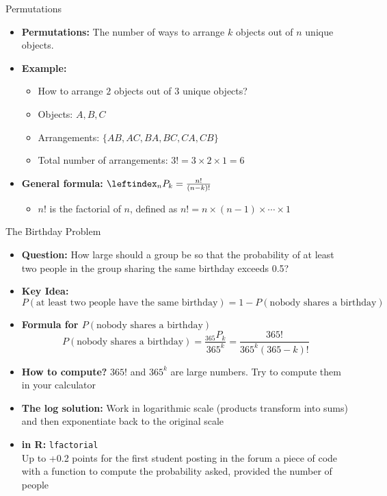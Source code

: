 \documentclass[aspectratio=169]{beamer}
\begin{document}
\begin{frame}{Permutations}
    \begin{itemize}
        \item \textbf{Permutations:} The number of ways to arrange \(k\) objects out of \(n\) unique objects.
        \item \textbf{Example:}
        \begin{itemize}
            \item[$\bullet$] How to arrange $2$ objects out of $3$ unique objects?
            \item[$\bullet$] Objects: \(A, B, C\)
            \item[$\bullet$] Arrangements: \(\{AB, AC, BA, BC, CA, CB\}\)
            \item[$\bullet$] Total number of arrangements: \(3! = 3 \times 2 \times 1 = 6\)
        \end{itemize}
        \item \textbf{General formula:} $\leftindex_{n}{P}_k = \frac{n!}{(n-k)!}$
        \begin{itemize}
            \item[$\bullet$] $n!$ is the factorial of \(n\), defined as \(n! = n \times (n-1) \times \cdots \times 1\)
        \end{itemize}
    \end{itemize}
\end{frame}

\begin{frame}{The Birthday Problem}
    \begin{itemize}
        \item \textbf{Question:} How large should a group be so that the probability of at least two people in the group sharing the same birthday exceeds 0.5?
        \item \textbf{Key Idea:}
        \[
        P(\text{at least two people have the same birthday}) = 1 - P(\text{nobody shares a birthday})
        \]
        \item \textbf{Formula for \(P(\text{nobody shares a birthday})\)}
        \[
        P(\text{nobody shares a birthday}) = \frac{_{365}P_k}{365^k} = \frac{365!}{365^k (365-k)!}
        \]
        \item \textbf{How to compute?} $365!$ and $365^k$ are large numbers. Try to compute them in your calculator
        \item \textbf{The log solution:} Work in logarithmic scale (products transform into sums) and then exponentiate back to the original scale
        \item \textbf{in R:} \texttt{lfactorial} \\
        \scriptsize{Up to +0.2 points for the first student posting in the forum a piece of code with a function to compute the probability asked, provided the number of people}
    \end{itemize}
    
\end{frame}
\end{document}
